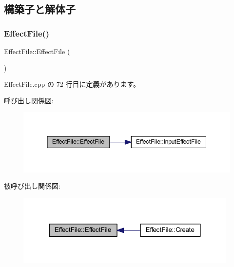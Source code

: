 \subsection{構築子と解体子}
\mbox{\label{class_effect_file_a7c3363080d705db79fada75691d4a9c8}} 
\subsubsection{\texorpdfstring{Effect\+File()}{EffectFile()}}
{\footnotesize\ttfamily Effect\+File\+::\+Effect\+File (\begin{DoxyParamCaption}{ }\end{DoxyParamCaption})\hspace{0.3cm}{\ttfamily [private]}}



 Effect\+File.\+cpp の 72 行目に定義があります。

呼び出し関係図\+:
\nopagebreak
\begin{figure}[H]
\begin{center}
\leavevmode
\includegraphics[width=345pt]{class_effect_file_a7c3363080d705db79fada75691d4a9c8_cgraph}
\end{center}
\end{figure}
被呼び出し関係図\+:
\nopagebreak
\begin{figure}[H]
\begin{center}
\leavevmode
\includegraphics[width=312pt]{class_effect_file_a7c3363080d705db79fada75691d4a9c8_icgraph}
\end{center}
\end{figure}
\mbox{\label{class_effect_file_ad91db4821340cdcfd855d168a7e3fbf8}} 
